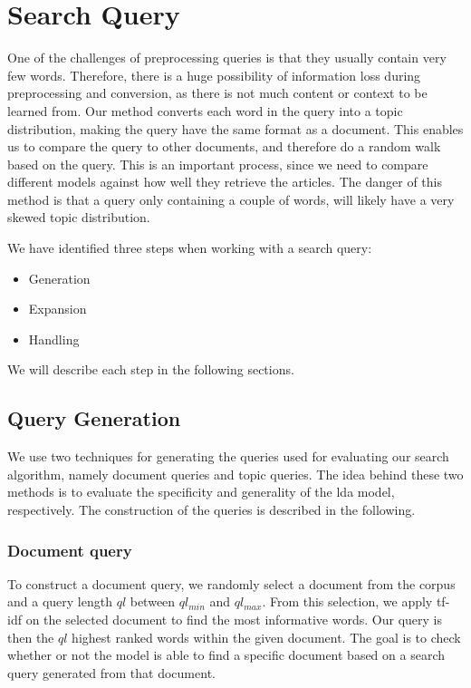 \section{Search Query}
One of the challenges of preprocessing queries is that they usually contain very few words.
Therefore, there is a huge possibility of information loss during preprocessing and conversion, as there is not much content or context to be learned from.
Our method converts each word in the query into a topic distribution, making the query have the same format as a document. 
This enables us to compare the query to other documents, and therefore do a random walk based on the query.
This is an important process, since we need to compare different models against how well they retrieve the articles.
The danger of this method is that a query only containing a couple of words, will likely have a very skewed topic distribution.

We have identified three steps when working with a search query:
\begin{itemize}
	\item Generation
	\item Expansion
	\item Handling
\end{itemize}
We will describe each step in the following sections.
\subsection{Query Generation}
We use two techniques for generating the queries used for evaluating our search algorithm, namely document queries and topic queries.
The idea behind these two methods is to evaluate the specificity and generality of the \gls{lda} model, respectively.
The construction of the queries is described in the following.

\subsubsection{Document query}
To construct a document query, we randomly select a document from the corpus and a query length $ql$ between $ql_{min}$ and $ql_{max}$.
From this selection, we apply \gls{tf-idf} on the selected document to find the most informative words.
Our query is then the $ql$ highest ranked words within the given document.
The goal is to check whether or not the model is able to find a specific document based on a search query generated from that document.

